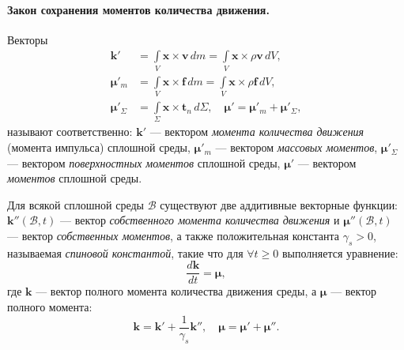 
\paragraph{Закон сохранения моментов количества движения.}
\begin{definition*}
	Векторы
	\begin{align*}
		\mathbf{k}' &= \int\limits_{V} \mathbf{x} \times \mathbf{v} \, dm = \int\limits_{V} \mathbf{x} \times \rho \mathbf{v} \, dV, \\
		\boldsymbol{\mu}'_m &= \int\limits_{V} \mathbf{x} \times \mathbf{f} \, dm = \int\limits_{V} \mathbf{x} \times \rho \mathbf{f} \, dV, \\
		\boldsymbol{\mu}'_{\Sigma} &= \int\limits_{\Sigma} \mathbf{x} \times \mathbf{t}_n \, d\Sigma, \quad \boldsymbol{\mu}' = \boldsymbol{\mu}'_{m} + \boldsymbol{\mu}'_{\Sigma},
	\end{align*}
	называют соответственно: $\mathbf{k}'$ --- вектором \textit{момента количества движения} (момента импульса) сплошной среды, $\boldsymbol{\mu}'_m$ --- вектором \textit{массовых моментов}, $\boldsymbol{\mu}'_{\Sigma}$ --- вектором \textit{поверхностных моментов} сплошной среды, $\boldsymbol{\mu}'$ --- вектором \textit{моментов} сплошной среды.
\end{definition*}

\begin{axiom*}
	Для всякой сплошной среды $\mathcal{B}$ существуют две аддитивные векторные функции: $\mathbf{k}''(\mathcal{B}, t)$ --- вектор \textit{собственного момента количества движения} и $\boldsymbol{\mu}''(\mathcal{B}, t)$ --- вектор \textit{собственных моментов}, а также положительная константа $\gamma_s > 0$, называемая \textit{спиновой константой}, такие что для $\forall t \geqslant 0$ выполняется уравнение:
	\begin{equation*}
		\frac{d\mathbf{k}}{dt} = \boldsymbol{\mu},
	\end{equation*}
	где $\mathbf{k}$ --- вектор полного момента количества движения среды, а $\boldsymbol{\mu}$ --- вектор полного момента:
	\begin{equation*}
		\mathbf{k} = \mathbf{k}' + \frac{1}{\gamma_s} \mathbf{k}'', \quad \boldsymbol{\mu} = \boldsymbol{\mu}' + \boldsymbol{\mu}''.
	\end{equation*}
\end{axiom*}

